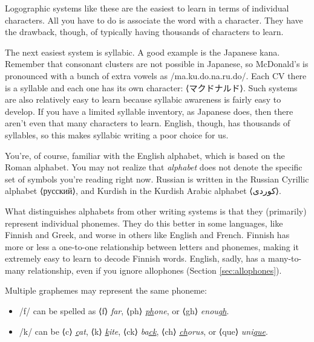 Logographic systems like these are the easiest to learn in terms of individual characters. All you have to do is associate the word with a character. They have the drawback, though, of typically having thousands of characters to learn.

The next easiest system is syllabic. A good example is the Japanese kana. Remember that consonant clusters are not possible in Japanese, so McDonald's is pronounced with a bunch of extra vowels as /ma.ku.do.na.ru.do/. Each CV there is a syllable and each one has its own character: ⟨マクドナルド⟩. Such systems are also relatively easy to learn because syllabic awareness is fairly easy to develop. If you have a limited syllable inventory, as Japanese does, then there aren't even that many characters to learn. English, though, has thousands of syllables, so this makes syllabic writing a poor choice for us.

You're, of course, familiar with the English alphabet, which is based on the Roman alphabet. You may not realize that \textit{alphabet} does not denote the specific set of symbols you're reading right now. Russian is written in the Russian Cyrillic alphabet ⟨русский⟩, and Kurdish in the Kurdish Arabic alphabet ⟨کوردی⟩.

What distinguishes alphabets from other writing systems is that they (primarily) represent individual phonemes. They do this better in some languages, like Finnish and Greek, and worse in others like English and French. Finnish has more or less a one-to-one relationship between letters and phonemes, making it extremely easy to learn to decode Finnish words. English, sadly, has a many-to-many relationship, even if you ignore allophones (Section \ref{sec:allophones}). 

Multiple graphemes may represent the same phoneme:

\begin{itemize}[noitemsep]
    \item /f/ can be spelled as ⟨f⟩ \textit{\uline{f}ar}, ⟨ph⟩ \textit{\uline{ph}one}, or ⟨gh⟩ \textit{enou\uline{gh}}.
    \item /k/ can be ⟨c⟩ \textit{\uline{c}at}, ⟨k⟩ \textit{\uline{k}ite}, ⟨ck⟩ \textit{ba\uline{ck}}, ⟨ch⟩ \textit{\uline{ch}orus}, or ⟨que⟩ \textit{uni\uline{que}}.
\end{itemize}
        
